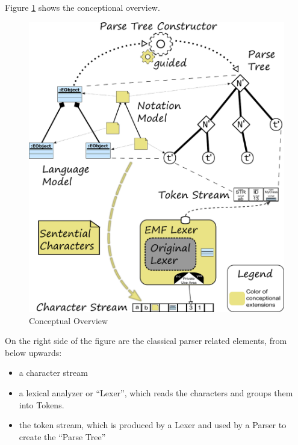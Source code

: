 Figure \ref{ConceptFigure} shows the conceptional overview.
\begin{figure}
\centering
\includegraphics[scale=0.75]{gfx/ex/Concept} 
\caption{Conceptual Overview}
\label{ConceptFigure}
\end{figure}
On the right side of the figure are the classical parser related elements, from below upwards:
\begin{itemize}
	\item a character stream
	\item a lexical analyzer or ``Lexer'', which reads the characters and groups them into Tokens.
	\item the token stream, which is produced by a Lexer and used by a Parser to create the ``Parse Tree''
\end{itemize}

